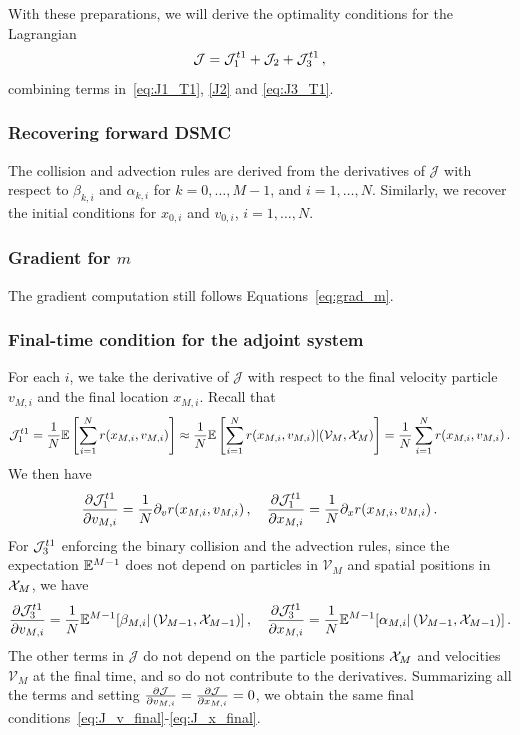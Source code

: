 \documentclass[12pt,nopreprintline]{elsarticle}
\begin{document}
With these preparations, we will derive the optimality conditions for the Lagrangian
\[
\mathcal J = \mathcal J_1^{t1} +  \mathcal J_2 +   \mathcal J_{3}^{t1}\,,
\]
combining terms in~\eqref{eq:J1_T1}, \eqref{J2} and \eqref{eq:J3_T1}.

\subsubsection{Recovering forward DSMC} The collision and advection rules are derived from  the derivatives of $\mathcal J$  with   respect to $ \beta_{k,i}$ and $\alpha_{k,i}$ for $k = 0,\ldots, M-1$, and $i = 1,\ldots, N$. Similarly, we recover the initial conditions for $x_{0,i}$ and $v_{0,i}$, $i = 1,\ldots, N$.

\subsubsection{Gradient for $m$} The gradient computation still follows Equations~\eqref{eq:grad_m}.

\subsubsection{Final-time condition for the adjoint system} For each $i$,  we take the derivative of $\mathcal J$ with respect to the final velocity particle $v_{M,i}$ and the final location $x_{M,i}$. Recall that
$$
\mathcal J_1^{t1} =  \frac{1}{N} \mathbb{E} \left[ \sum_{i=1}^N r(x_{M,i}, v_{M,i}) \right]   \approx \frac{1}{N} \mathbb{E} \left[ \sum_{i=1}^N r(x_{M,i}, v_{M,i})
| (\mathcal V_M, \mathcal X_M) \right]  = \frac{1}{N}  \sum_{i=1}^N r(x_{M,i}, v_{M,i})\,.
$$
We then have
\[
\frac{\partial \mathcal J_{1}^{t1} }{\partial v_{M,i}}   =   \frac{1}{N} \partial_v r(x_{M,i}, v_{M,i}) \,,\quad  \frac{\partial \mathcal J_{1}^{t1} }{\partial x_{M,i}}   =   \frac{1}{N}
\partial_x r(x_{M,i}, v_{M,i}) \,.
\]
For $\mathcal J_{3}^{t1}$ enforcing the binary collision and the advection rules, since the expectation $\mathbb E^{M-1}$ does not depend on particles in $\mathcal{V}_M$ and spatial positions in $\mathcal X_M$, we have
\[
\frac{\partial \mathcal J_{3}^{t1} }{\partial v_{M,i}}   =   \frac{1}{N} \mathbb E^{M-1}[ \beta_{M,i} |  \left( \mathcal{V}_{M-1} , \mathcal{X}_{M-1} \right)  ]  \,,\quad  \frac{\partial \mathcal J_{3}^{t1} }{\partial x_{M,i}}   =   \frac{1}{N}
\mathbb E^{M-1}[ \alpha_{M,i} | \left( \mathcal{V}_{M-1} , \mathcal{X}_{M-1} \right)] \,.
\]
The other terms  in  $\mathcal{J}$  do not depend on the particle positions $\mathcal X_M$ and velocities $\mathcal{V}_M$ at the final time, and so do not contribute to the derivatives. Summarizing all the terms and setting $ \frac{\partial \mathcal J }{\partial v_{M,i}}  =  \frac{\partial \mathcal J }{\partial x_{M,i}}  = 0$, we obtain the same final conditions~\eqref{eq:J_v_final}-\eqref{eq:J_x_final}.
\end{document}
